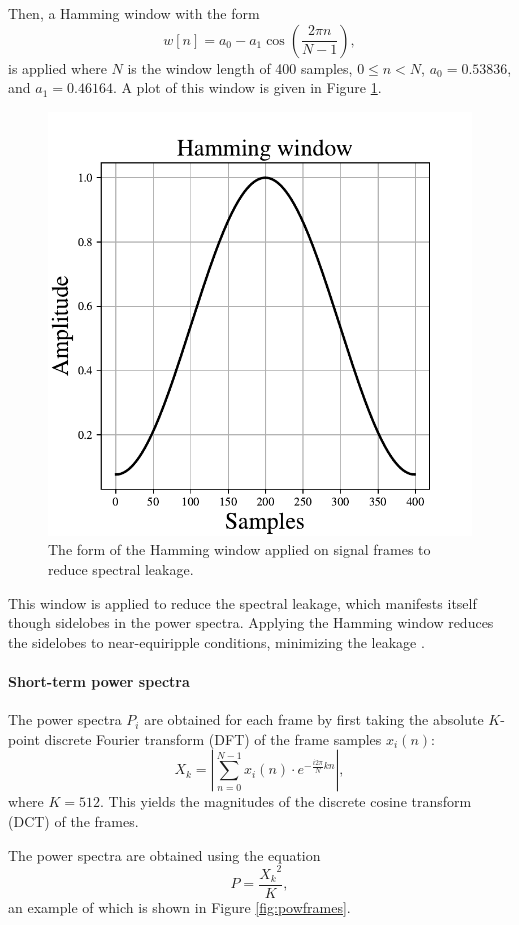 			Then, a Hamming window with the form
			\begin{equation}\label{eq:hamming}
				w\left[n\right] = a_0 - a_1\cos\left(\frac{2\pi n}{N-1}\right),
			\end{equation}
			is applied where $N$ is the window length of 400 samples, $0 \leq n < N$, $a_0 = 0.53836$, and $a_1 = 0.46164$.
			A plot of this window is given in Figure \ref{fig:hamming}.
			\begin{figure}[ht]
				\centering
			    \includegraphics[width=0.45\linewidth]{gfx/hamming}
			    \caption[Hamming window]{The form of the Hamming window applied on signal frames to reduce spectral leakage.}
			    \label{fig:hamming}
			\end{figure}
			This window is applied to reduce the spectral leakage, which manifests itself though sidelobes in the power spectra.
			Applying the Hamming window reduces the sidelobes to near-equiripple conditions, minimizing the leakage \citep{SASPWEB2011}.

		\paragraph{Short-term power spectra}

			The power spectra $P_i$ are obtained for each frame by first taking the absolute $K$-point discrete Fourier transform (DFT) of the frame samples $x_i(n)$:
			\begin{equation}
				X_k = \left|\sum_{n=0}^{N-1}x_i(n)\cdot e^{-\frac{i2\pi}{N}kn}\right|,
			\end{equation}
			where $K=512$.
			This yields the magnitudes of the discrete cosine transform (DCT) of the frames.

			The power spectra are obtained using the equation
			\begin{equation}\label{eq:powframes}
				P = \frac{{X_k}^2}{K},
			\end{equation}
			an example of which is shown in Figure \ref{fig:powframes}.

